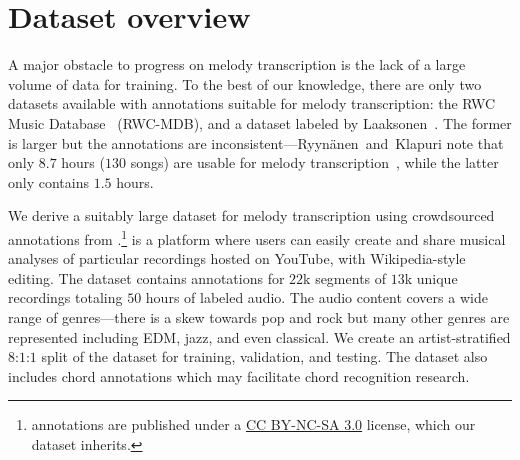 \vspace{-2mm}
\section{Dataset overview}
\label{sec:dataset}

A major obstacle to progress on melody transcription is the lack of a large volume of data for training. 
To the best of our knowledge, 
there are only two datasets available with annotations suitable for melody transcription: the RWC Music Database~\cite{goto2002rwc,goto2003rwc,goto2004development} (RWC-MDB), 
and a dataset labeled by Laaksonen~\cite{laaksonen2014automatic}. 
The former is larger but the annotations are inconsistent---Ryyn{\"a}nen~and~Klapuri note that only $8.7$ hours ($130$ songs) are usable for melody transcription~\cite{ryynanen2008automatic}, while the latter only contains $1.5$ hours. 

We 
derive 
a suitably large dataset for melody transcription using crowdsourced annotations from \hooktheory{}.\footnote{\hooktheory{} annotations are published under a \href{https://creativecommons.org/licenses/by-nc-sa/3.0/}{CC BY-NC-SA 3.0} license, which our dataset inherits.}
\hooktheory{} is a platform where users can easily create and share musical analyses of particular recordings hosted on YouTube, with Wikipedia-style editing. 
The dataset contains annotations for $22$k segments of $13$k unique recordings totaling $50$ hours of labeled audio. 
The audio content covers a wide range of genres---there is a skew towards pop and rock but many other genres are represented including EDM, jazz, and even classical. 
We create an artist-stratified $8$:$1$:$1$ split of the dataset for training, validation, and testing. 
The dataset also includes chord annotations which may facilitate chord recognition research.


